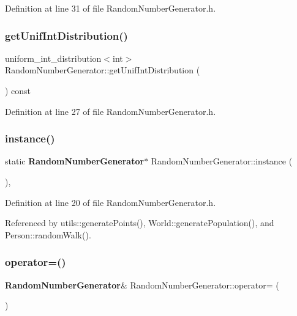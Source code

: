 Definition at line 31 of file Random\+Number\+Generator.\+h.

\mbox{\label{class_random_number_generator_a1055b1b761b18a73c7742bcdd06e388e}} 
\subsubsection{getUnifIntDistribution()}
{\footnotesize\ttfamily uniform\+\_\+int\+\_\+distribution$<$int$>$ Random\+Number\+Generator\+::get\+Unif\+Int\+Distribution (\begin{DoxyParamCaption}{ }\end{DoxyParamCaption}) const\hspace{0.3cm}{\ttfamily [inline]}}



Definition at line 27 of file Random\+Number\+Generator.\+h.

\mbox{\label{class_random_number_generator_ab20e4f6dae4e1d216357d26675488e45}} 
\subsubsection{instance()}
{\footnotesize\ttfamily static \textbf{ Random\+Number\+Generator}$\ast$ Random\+Number\+Generator\+::instance (\begin{DoxyParamCaption}{ }\end{DoxyParamCaption})\hspace{0.3cm}{\ttfamily [inline]}, {\ttfamily [static]}}



Definition at line 20 of file Random\+Number\+Generator.\+h.



Referenced by utils\+::generate\+Points(), World\+::generate\+Population(), and Person\+::random\+Walk().

\mbox{\label{class_random_number_generator_a5986c38214e8c774239eee89c768f172}} 
\subsubsection{operator=()}
{\footnotesize\ttfamily \textbf{ Random\+Number\+Generator}\& Random\+Number\+Generator\+::operator= (\begin{DoxyParamCaption}\item[{const \textbf{ Random\+Number\+Generator} \&}]{ }\end{DoxyParamCaption})\hspace{0.3cm}{\ttfamily [private]}}



